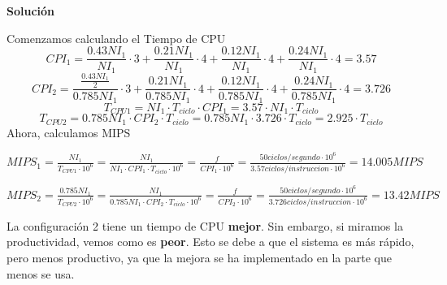 \documentclass[12pt,spanish]{article}
\newenvironment{solution}{
	\par
	\textbf{Solución}
	\par
	\begin{center}
}
{
	\end{center}
}
\begin{document}
\begin{enumerate}
\begin{solution}
Comenzamos calculando el Tiempo de CPU
\[
CPI_1=\frac{0.43NI_1}{NI_1}\cdot 3 + \frac{0.21NI_1}{NI_1}\cdot 4 + \frac{0.12NI_1}{NI_1}\cdot 4 + \frac{0.24NI_1}{NI_1}\cdot 4 =3.57
\]
\[
CPI_2=\frac{\frac{0.43NI_1}{2}}{0.785NI_1}\cdot 3 + \frac{0.21NI_1}{0.785NI_1}\cdot 4 + \frac{0.12NI_1}{0.785NI_1}\cdot 4 + \frac{0.24NI_1}{0.785NI_1}\cdot 4 =3.726
\]
\[T_{CPU1}=NI_1 \cdot T_{ciclo} \cdot CPI_1=3.57 \cdot NI_1 \cdot T_{ciclo}
\]
\[T_{CPU2}=0.785NI_1  \cdot CPI_2 \cdot T_{ciclo}=0.785NI_1 \cdot 3.726 \cdot T_{ciclo}=2.925 \cdot T_{ciclo}
\]
Ahora, calculamos MIPS
\begin{adjustbox}{width=\textwidth,totalheight=\textheight,keepaspectratio}
$MIPS_1=\frac{NI_1}{T_{CPU1} \cdot 10^6}=\frac{NI_1}{NI_1 \cdot CPI_1 \cdot T_{ciclo} \cdot 10^6}=\frac{f}{CPI_1 \cdot 10^6}=\frac{50 ciclos/segundo \cdot 10^6}{3.57 ciclos/instruccion \cdot 10^6}=14.005 MIPS
$
\end{adjustbox}
\begin{adjustbox}{width=\textwidth,totalheight=\textheight,keepaspectratio}
$MIPS_2=\frac{0.785NI_1}{T_{CPU2} \cdot 10^6}=\frac{NI_1}{0.785NI_1 \cdot CPI_2 \cdot T_{ciclo} \cdot 10^6}=\frac{f}{CPI_2 \cdot 10^6}=\frac{50 ciclos/segundo \cdot 10^6}{3.726 ciclos/instruccion \cdot 10^6}=13.42 MIPS
$
\end{adjustbox}
\par
La configuración 2 tiene un tiempo de CPU \textbf{mejor}. Sin embargo, si miramos la productividad, vemos como es \textbf{peor}. Esto se debe a que el sistema es más rápido, pero menos productivo, ya que la mejora se ha implementado en la parte que menos se usa.
\end{solution}
\end{enumerate}
\end{document}
